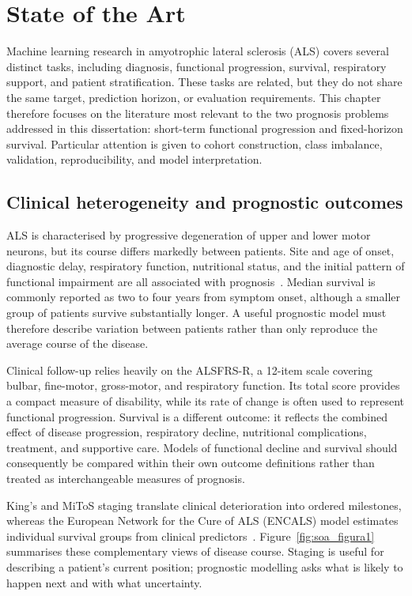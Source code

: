 \chapter{State of the Art}
\label{sec:stateoftheart}

Machine learning research in amyotrophic lateral sclerosis (\gls{ALS}) covers several distinct tasks, including diagnosis, functional progression, survival, respiratory support, and patient stratification. These tasks are related, but they do not share the same target, prediction horizon, or evaluation requirements. This chapter therefore focuses on the literature most relevant to the two prognosis problems addressed in this dissertation: short-term functional progression and fixed-horizon survival. Particular attention is given to cohort construction, class imbalance, validation, reproducibility, and model interpretation.

\section{Clinical heterogeneity and prognostic outcomes}

\gls{ALS} is characterised by progressive degeneration of upper and lower motor neurons, but its course differs markedly between patients. Site and age of onset, diagnostic delay, respiratory function, nutritional status, and the initial pattern of functional impairment are all associated with prognosis~\cite{Feldman2022}. Median survival is commonly reported as two to four years from symptom onset, although a smaller group of patients survive substantially longer. A useful prognostic model must therefore describe variation between patients rather than only reproduce the average course of the disease.

Clinical follow-up relies heavily on the \gls{ALSFRS-R}, a 12-item scale covering bulbar, fine-motor, gross-motor, and respiratory function. Its total score provides a compact measure of disability, while its rate of change is often used to represent functional progression. Survival is a different outcome: it reflects the combined effect of disease progression, respiratory decline, nutritional complications, treatment, and supportive care. Models of functional decline and survival should consequently be compared within their own outcome definitions rather than treated as interchangeable measures of prognosis.

King's and MiToS staging translate clinical deterioration into ordered milestones, whereas the European Network for the Cure of ALS (ENCALS) model estimates individual survival groups from clinical predictors~\cite{roche2012staging,chio2015mitos,westeneng2018encals}. Figure~\ref{fig:soa_figura1} summarises these complementary views of disease course. Staging is useful for describing a patient's current position; prognostic modelling asks what is likely to happen next and with what uncertainty.

